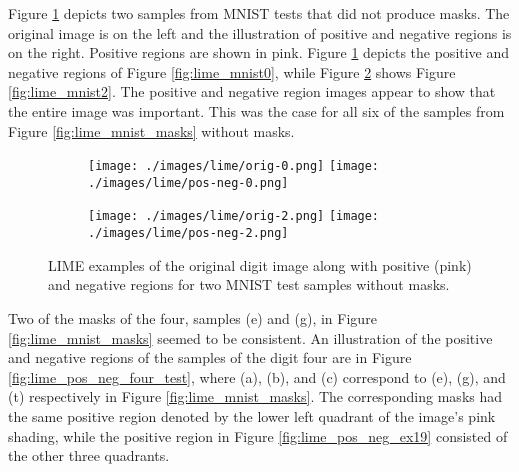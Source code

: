 Figure \ref{fig:lime_pos_neg_ex0} depicts two samples from MNIST tests that did
not produce masks. The original image is on the left and the illustration of
positive and negative regions is on the right. Positive regions are shown in
pink. Figure \ref{fig:lime_pos_neg_ex0} depicts the positive and negative
regions of Figure \ref{fig:lime_mnist0}, while Figure \ref{fig:lime_pos_neg_ex2}
shows Figure \ref{fig:lime_mnist2}.  The positive and negative region images
appear to show that the entire image was important.  This was the case for all
six of the samples from Figure \ref{fig:lime_mnist_masks} without masks.

\begin{figure}[H]
    \centering

    \begin{subfigure}{0.50\columnwidth}
        \centering
        \texttt{[image: ./images/lime/orig-0.png]}
        \texttt{[image: ./images/lime/pos-neg-0.png]}
        \caption{}
        \label{fig:lime_pos_neg_ex0}
    \end{subfigure}%
    \begin{subfigure}{0.50\columnwidth}
        \centering
        \texttt{[image: ./images/lime/orig-2.png]}
        \texttt{[image: ./images/lime/pos-neg-2.png]}
        \caption{}
        \label{fig:lime_pos_neg_ex2}
    \end{subfigure}

    \caption{LIME examples of the original digit image along with positive (pink) and negative regions for two MNIST test samples without masks.}
    \label{fig:lime_pos_neg_no_mask}
\end{figure}

Two of the masks of the four, samples (e) and (g), in Figure
\ref{fig:lime_mnist_masks} seemed to be consistent. An illustration of the
positive and negative regions of the samples of the digit four are in Figure
\ref{fig:lime_pos_neg_four_test}, where (a), (b), and (c) correspond to (e),
(g), and (t) respectively in Figure \ref{fig:lime_mnist_masks}. The
corresponding masks had the same positive region denoted by the lower left
quadrant of the image's pink shading, while the positive region in Figure
\ref{fig:lime_pos_neg_ex19} consisted of the other three quadrants.

